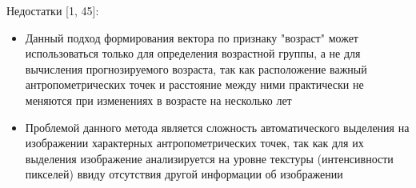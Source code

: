 \documentclass[main.tex]{subfiles}
\begin{document}
Недостатки [1, 45]:
\begin{itemize}
    \item Данный подход формирования вектора по признаку "возраст" может использоваться только для определения возрастной группы, а не для вычисления прогнозируемого возраста, так как расположение важный антропометрических точек и расстояние между ними практически не меняются при изменениях в возрасте на несколько лет
    \item Проблемой данного метода является сложность автоматического выделения на изображении характерных антропометрических точек, так как для их выделения изображение анализируется на уровне текстуры (интенсивности пикселей) ввиду отсутствия другой информации об изображении
\end{itemize}
\end{document}
